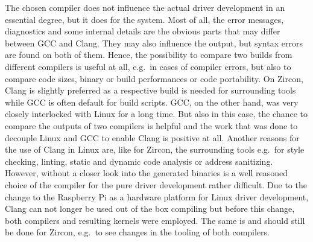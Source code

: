 The chosen compiler does not influence the actual driver development in an essential degree, but it does for the system.
Most of all, the error messages, diagnostics and some internal details are the obvious parts that may differ between GCC and Clang.
They may also influence the output, but syntax errors are found on both of them.
Hence, the possibility to compare two builds from different compilers is useful at all, e.g.\ in cases of compiler errors, but also to compare code sizes, binary or build performances or code portability.
On Zircon, Clang is slightly preferred as a respective build is needed for surrounding tools while GCC is often default for build scripts.
GCC, on the other hand, was very closely interlocked with Linux for a long time.
But also in this case, the chance to compare the outputs of two compilers is helpful and the work that was done to decouple Linux and GCC to enable Clang is positive at all.
Another reasons for the use of Clang in Linux are, like for Zircon, the surrounding tools e.g.\ for style checking, linting, static and dynamic code analysis or address sanitizing\cite{linux-llvm}.
However, without a closer look into the generated binaries is a well reasoned choice of the compiler for the pure driver development rather difficult.
Due to the change to the Raspberry Pi as a hardware platform for Linux driver development, Clang can not longer be used out of the box compiling but before this change, both compilers and resulting kernels were employed.
The same is and should still be done for Zircon, e.g.\ to see changes in the tooling of both compilers.

